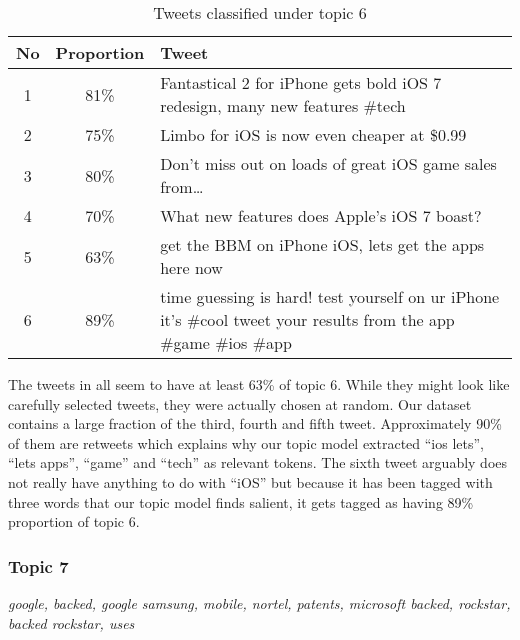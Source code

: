 \begin{table}[H]
  \begin{tabular}{c c p{13cm}} \toprule
    No & Proportion & Tweet \\ \midrule
    1  & 81\%       & Fantastical 2 for iPhone gets bold iOS 7 redesign, many new features \#tech \\ \midrule
    2  & 75\%       & Limbo for iOS is now even cheaper at \$0.99 \\ \midrule
    3  & 80\%       & Don't miss out on loads of great iOS game sales from\ldots \\ \midrule
    4  & 70\%       & What new features does Apple's iOS 7 boast? \\ \midrule
    5  & 63\%       & get the BBM on iPhone iOS, lets get the apps here now \\ \midrule
    6  & 89\%       & time guessing is hard! test yourself on ur iPhone it's \#cool tweet your
    results from the app \#game \#ios \#app \\ \bottomrule
  \end{tabular}
  \caption{Tweets classified under topic 6}
  \label{tab:tweets_under_6}
\end{table}

The tweets in  all seem to have at least 63\% of topic 6. While they
might look like carefully selected tweets, they were actually chosen at random. Our dataset contains
a large fraction of the third, fourth and fifth tweet. Approximately 90\% of them are retweets which
explains why our topic model extracted ``ios lets'', ``lets apps'', ``game'' and ``tech'' as
relevant tokens. The sixth tweet arguably does not really have anything to do with ``iOS'' but
because it has been tagged with three words that our topic model finds salient, it gets tagged as
having 89\% proportion of topic 6.



\subsubsection{Topic 7}
\label{sec:topic_7}
\textit{google, backed, google samsung, mobile, nortel, patents, microsoft backed, rockstar, backed
rockstar, uses } \\\\


